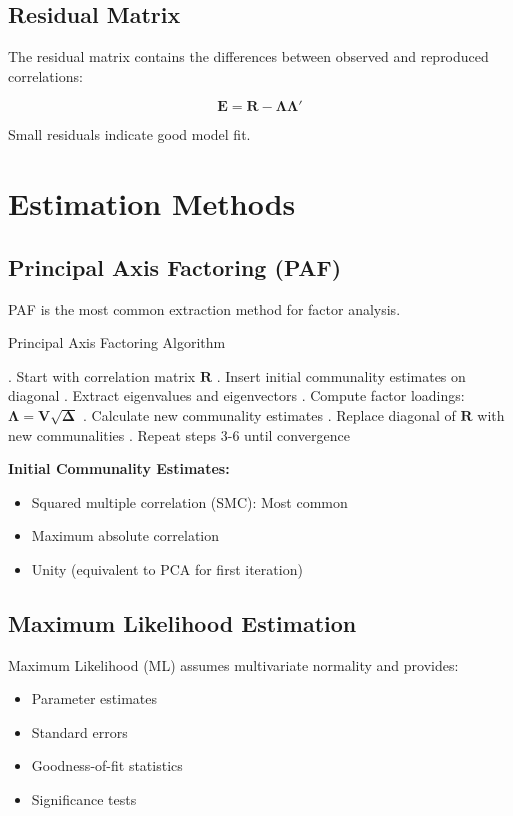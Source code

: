 \documentclass[a4paper]{tufte-book}
\begin{document}
\subsection{Residual Matrix}

The residual matrix contains the differences between observed and reproduced correlations:

$$\mathbf{E} = \mathbf{R} - \boldsymbol{\Lambda}\boldsymbol{\Lambda}'$$

Small residuals indicate good model fit.

\section{Estimation Methods}

\subsection{Principal Axis Factoring (PAF)}

PAF is the most common extraction method for factor analysis.

\begin{algorithm}
\caption{Principal Axis Factoring Algorithm}
\begin{algorithmic}
. Start with correlation matrix $\mathbf{R}$
. Insert initial communality estimates on diagonal
. Extract eigenvalues and eigenvectors
. Compute factor loadings: $\boldsymbol{\Lambda} = \mathbf{V}\sqrt{\boldsymbol{\Delta}}$
. Calculate new communality estimates
. Replace diagonal of $\mathbf{R}$ with new communalities
. Repeat steps 3-6 until convergence
\end{algorithmic}
\end{algorithm}

\textbf{Initial Communality Estimates:}
\begin{itemize}
\item Squared multiple correlation (SMC): Most common
\item Maximum absolute correlation
\item Unity (equivalent to PCA for first iteration)
\end{itemize}

\subsection{Maximum Likelihood Estimation}

Maximum Likelihood (ML) assumes multivariate normality and provides:
\begin{itemize}
\item Parameter estimates
\item Standard errors
\item Goodness-of-fit statistics
\item Significance tests
\end{itemize}
\end{document}
